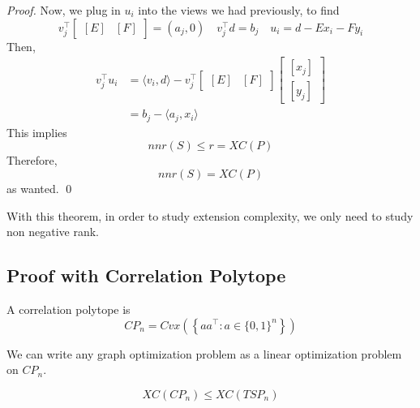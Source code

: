 \begin{proof}
	Now, we plug in $u_i$ into the views we had previously, to find 
	\begin{equation}
		v_j ^\top \begin{bmatrix}
			[E] & [F]
		\end{bmatrix} = (a_j, 0) \quad v_j^\top d = b_j \quad u_i = d - Ex_i - Fy_i
	\end{equation} 
	Then, 
	\begin{align}
		v_j^\top u_i 
		&= \langle v_i, d \rangle - v_j^\top \begin{bmatrix}
			[E] & [F]
		\end{bmatrix} \begin{bmatrix}
			[x_j] \\ [y_j]
		\end{bmatrix} \\
		&= b_j - \langle a_j, x_i \rangle 
	\end{align}
	This implies 
	\begin{equation}
		nnr(S) \leq r = XC(P)
	\end{equation}
	Therefore, 
	\begin{equation}
		nnr(S) = XC(P)
	\end{equation}
	as wanted. \qed
\end{proof}

With this theorem, in order to study extension complexity, we only need to study non negative rank. 


\subsection{Proof with Correlation Polytope}
\begin{definition}
	A correlation polytope is
	\begin{equation}
		CP_n = Cvx \left( \left\{ aa^\top: a \in \{0, 1\}^n \right\} \right)
	\end{equation}
\end{definition}

\begin{proposition}
	We can write any graph optimization problem as a linear optimization problem on $CP_n$. 
\end{proposition}

\begin{proposition}
	\begin{equation}
		XC(CP_n) \leq XC(TSP_n) 
	\end{equation}
\end{proposition}

